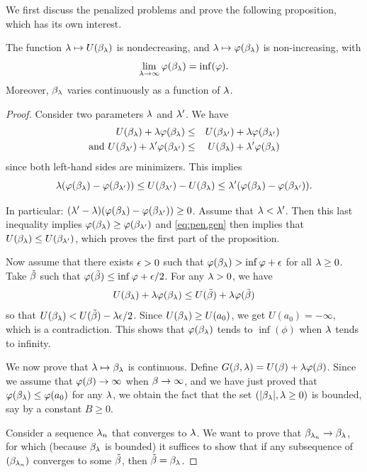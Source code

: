 We first discuss the penalized problems and prove the following
proposition, which has its own interest.
\begin{proposition}
\label{prop:pen.prop}
The function $\lambda \mapsto U(\beta_\lambda)$ is nondecreasing, and
$\lambda\mapsto \varphi(\beta_\lambda)$ is non-increasing, with
\[
\lim_{\lambda \to\infty} \varphi(\beta_\lambda) = \inf(\varphi).
\]
Moreover, $\beta_\lambda$ varies continuously as a function of $\lambda$.
\end{proposition} 
\begin{proof}
Consider two parameters $\lambda$ and $\lambda'$. We have
\begin{eqnarray*}
U(\beta_\lambda) + \lambda \varphi(\beta_\lambda) &\leq& U(\beta_{\lambda'}) + \lambda
\varphi(\beta_{\lambda'})\\
\text{and } U(\beta_{\lambda'}) + \lambda'
\varphi(\beta_{\lambda'}) &\leq& U(\beta_\lambda) + \lambda' \varphi(\beta_\lambda) 
\end{eqnarray*}
since both left-hand sides are minimizers. This implies
\begin{equation}
\label{eq:pen.gen}
\lambda (\varphi(\beta_\lambda) - \varphi(\beta_{\lambda'})) \leq U(\beta_{\lambda'}) - U(\beta_{\lambda})
\leq \lambda' (\varphi(\beta_\lambda) - \varphi(\beta_{\lambda'})).
\end{equation}

In particular: $(\lambda'-\lambda) (\varphi(\beta_\lambda) - \varphi(\beta_{\lambda'})) \geq
0$. Assume that $\lambda < \lambda'$. Then this last inequality implies
$\varphi(\beta_\lambda) \geq \varphi(\beta_{\lambda'})$ and \eqref{eq:pen.gen} then
implies that $U(\beta_\lambda) \leq U(\beta_{\lambda'})$, which proves the first
part of the proposition.

Now assume that there exists $\epsilon>0$ such that $\varphi(\beta_\lambda) > \inf\varphi +\epsilon$ for all $\lambda\geq 0$. Take $\tilde {\beta}$ such that $\varphi(\tilde {\beta}) \leq \inf\varphi + \epsilon/2$. For any $\lambda>0$, we have
\[
U(\beta_\lambda) + \lambda \varphi(\beta_\lambda) \leq U(\tilde {\beta}) + \lambda \varphi(\tilde{\beta})
\]
so that $U(\beta_\lambda) < U(\tilde{\beta}) - \lambda\epsilon/2$. Since $U(\beta_\lambda) \geq U({a_0})$, we get $U({a_0}) = -\infty$, which is a contradiction. This shows that $\varphi(\beta_\lambda)$ tends to $\inf(\phi)$ when $\lambda$ tends to infinity.


We now prove that $\lambda \mapsto \beta_\lambda$ is continuous.
Define $G(\beta,
\lambda)  = U(\beta) + \lambda\varphi(\beta)$. 
Since we assume that $\varphi(\beta)\to\infty$ when $\beta\to \infty$, and we
have just proved that $\varphi(\beta_\lambda) \leq \varphi({a_0})$ for any $\lambda$,
we obtain the fact that the set $(|\beta_\lambda|, \lambda\geq 0)$ is bounded, say by a
constant $B\geq 0$. 

Consider a sequence $\lambda_n$ that converges to $\lambda$. We want to prove
that $\beta_{\lambda_n} \to \beta_\lambda$, for which (because $\beta_\lambda$ is bounded)
it suffices to show that if any subsequence of $(\beta_{\lambda_n})$ converges to some
$\tilde {\beta}$, then $\tilde {\beta} = \beta_\lambda$.


\end{proof}

